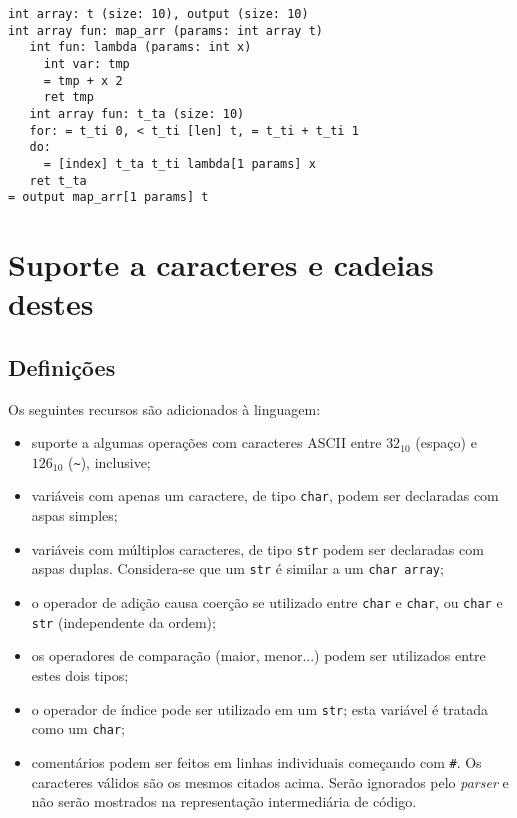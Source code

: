 \documentclass{article}
\newenvironment{smallitem}{
    \vspace{-1mm}
    \begin{itemize}
    \setlength{\parskip}{0pt}
    \setlength{\itemsep}{2pt}
}{
    \vspace{-2mm}
    \end{itemize}
}
\begin{document}
\begin{verbatim}
int array: t (size: 10), output (size: 10)
int array fun: map_arr (params: int array t)
   int fun: lambda (params: int x)
     int var: tmp
     = tmp + x 2
     ret tmp
   int array fun: t_ta (size: 10)
   for: = t_ti 0, < t_ti [len] t, = t_ti + t_ti 1
   do:
     = [index] t_ta t_ti lambda[1 params] x
   ret t_ta
= output map_arr[1 params] t
\end{verbatim}



\section{Suporte a caracteres e cadeias destes}

\subsection{Definições}

Os seguintes recursos são adicionados à linguagem:

\begin{smallitem}
    \item suporte a algumas operações com caracteres ASCII entre $32_{10}$
        (espaço) e $126_{10}$ (\texttt{\~}), inclusive;
    \item variáveis com apenas um caractere, de tipo \texttt{char}, podem ser
        declaradas com aspas simples;
    \item variáveis com múltiplos caracteres, de tipo \texttt{str} podem ser
        declaradas com aspas duplas. Considera-se que um \texttt{str} é
        similar a um \texttt{char array};
    \item o operador de adição causa coerção se utilizado entre \texttt{char} e
        \texttt{char}, ou \texttt{char} e \texttt{str} (independente da ordem);
    \item os operadores de comparação (maior, menor...) podem ser utilizados
        entre estes dois tipos;
    \item o operador de índice pode ser utilizado em um \texttt{str}; esta
        variável é tratada como um \texttt{char};
    \item comentários podem ser feitos em linhas individuais começando com
        \texttt{\#}. Os caracteres válidos são os mesmos citados acima.
        Serão ignorados pelo \emph{parser} e não serão mostrados na
        representação intermediária de código.
\end{smallitem}
\end{document}
